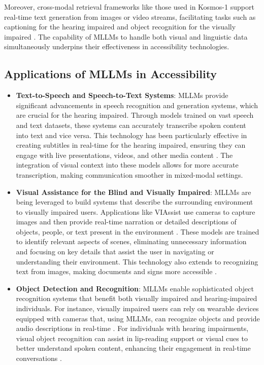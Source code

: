 Moreover, cross-modal retrieval frameworks like those used in Kosmos-1 support real-time text generation from images or video streams, facilitating tasks such as captioning for the hearing impaired and object recognition for the visually impaired \cite{vs2024gomez}. The capability of MLLMs to handle both visual and linguistic data simultaneously underpins their effectiveness in accessibility technologies.

\subsection{Applications of MLLMs in Accessibility}

\begin{itemize}
    \item \textbf{Text-to-Speech and Speech-to-Text Systems}: MLLMs provide significant advancements in speech recognition and generation systems, which are crucial for the hearing impaired. Through models trained on vast speech and text datasets, these systems can accurately transcribe spoken content into text and vice versa. This technology has been particularly effective in creating subtitles in real-time for the hearing impaired, ensuring they can engage with live presentations, videos, and other media content \cite{vs2023chen,vs2024rao}. The integration of visual context into these models allows for more accurate transcription, making communication smoother in mixed-modal settings.

    \item \textbf{Visual Assistance for the Blind and Visually Impaired}: MLLMs are being leveraged to build systems that describe the surrounding environment to visually impaired users. Applications like VIAssist use cameras to capture images and then provide real-time narration or detailed descriptions of objects, people, or text present in the environment \cite{vs2024yang}. These models are trained to identify relevant aspects of scenes, eliminating unnecessary information and focusing on key details that assist the user in navigating or understanding their environment. This technology also extends to recognizing text from images, making documents and signs more accessible \cite{vs2024song}.

    \item \textbf{Object Detection and Recognition}: MLLMs enable sophisticated object recognition systems that benefit both visually impaired and hearing-impaired individuals. For instance, visually impaired users can rely on wearable devices equipped with cameras that, using MLLMs, can recognize objects and provide audio descriptions in real-time \cite{vs2024li}. For individuals with hearing impairments, visual object recognition can assist in lip-reading support or visual cues to better understand spoken content, enhancing their engagement in real-time conversations \cite{vs2020parde}.


\end{itemize}

